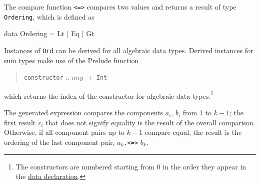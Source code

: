 The compare function \texttt{<=>} compares two values and returns a result of type \texttt{Ordering}, which is defined as
\begin{code}
    data Ordering = Lt | Eq | Gt
\end{code}

Instances of \texttt{Ord} can be derived for all algebraic data types. Derived instances for sum types make use of the Prelude function
\begin{quote}
\texttt{constructor} :: $any \rightarrow$ \texttt{Int}
\end{quote}
which returns the index of the constructor for algebraic data types.\footnote{The constructors are numbered starting from 0 in the order they appear in the \hyperref[datadcl]{data declaration}.}

The generated expression compares the components $a_i$, $b_i$ from 1 to $k-1$; the first result $r_i$ that does not signify equality is the result of the overall comparison. Otherwise, if all component pairs up to ${k-1}$ compare equal, the result is the ordering of the last component pair, $a_k$\texttt{.<=>} $b_k$.

